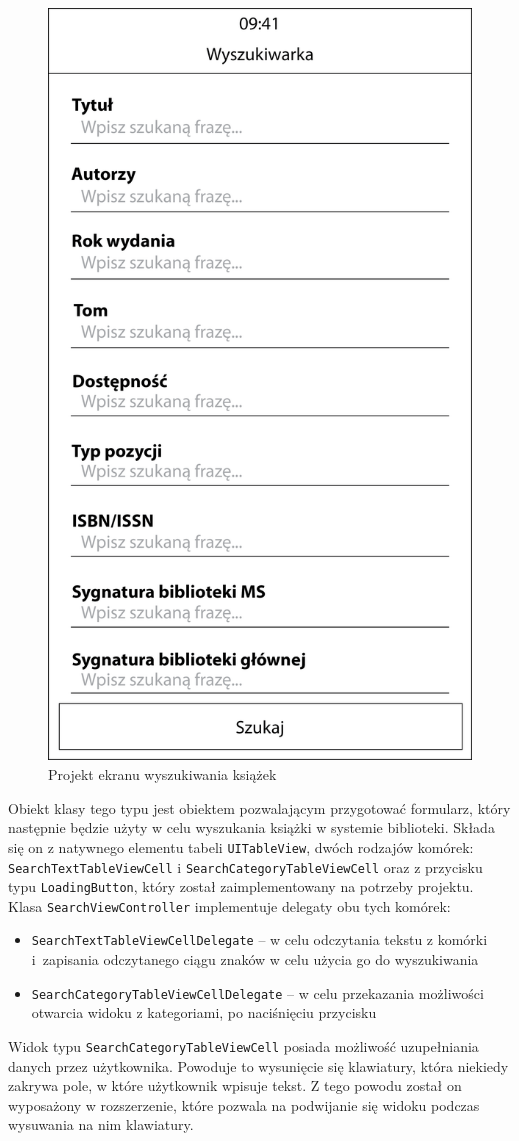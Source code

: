 \documentclass[twoside]{projektInzynierskiMS}
\begin{document}
\begin{figure}[h]
  \centering
  \includegraphics[width=0.4\linewidth]{img/SearchProject.png}
  \caption{Projekt ekranu wyszukiwania książek}
  \label{fig:iosCategories}
\end{figure}

Obiekt klasy tego typu jest obiektem pozwalającym przygotować formularz, który następnie będzie użyty w celu wyszukania książki w systemie biblioteki. Składa się on z natywnego elementu tabeli \verb`UITableView`, dwóch rodzajów komórek: \verb`SearchTextTableViewCell` i \verb`SearchCategoryTableViewCell` oraz z przycisku typu \verb`LoadingButton`, który został zaimplementowany na potrzeby projektu. Klasa \verb`SearchViewController` implementuje delegaty obu tych komórek:
\begin{itemize}
\item \verb`SearchTextTableViewCellDelegate` -- w celu odczytania tekstu z komórki i~zapisania odczytanego ciągu znaków w celu użycia go do wyszukiwania
\item \verb`SearchCategoryTableViewCellDelegate` -- w celu przekazania możliwości otwarcia widoku z kategoriami, po naciśnięciu przycisku 
\end{itemize}

Widok typu \verb`SearchCategoryTableViewCell` posiada możliwość uzupełniania danych przez użytkownika. Powoduje to wysunięcie się klawiatury, która niekiedy zakrywa pole, w które użytkownik wpisuje tekst. Z tego powodu został on wyposażony w rozszerzenie, które pozwala na podwijanie się widoku podczas wysuwania na nim klawiatury.
\end{document}
